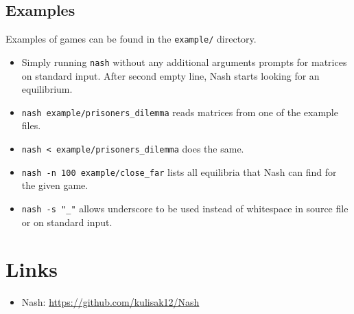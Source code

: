 \documentclass[a4paper,11pt]{article}
\begin{document}
\subsection{Examples}

Examples of games can be found in the \verb|example/| directory.

\begin{itemize}
	\item Simply running \verb|nash| without any additional arguments prompts for matrices on standard input. After second empty line, Nash starts looking for an equilibrium.
	\item \verb|nash example/prisoners_dilemma| reads matrices from one of the example files.
	\item \verb|nash < example/prisoners_dilemma| does the same.
	\item \verb|nash -n 100 example/close_far| lists all equilibria that Nash can find for the given game.
	\item \verb|nash -s "_"| allows underscore to be used instead of whitespace in source file or on standard input. 
\end{itemize}

\section{Links}

\begin{itemize}
	\item Nash: \url{https://github.com/kulisak12/Nash}
\end{itemize}
\end{document}
